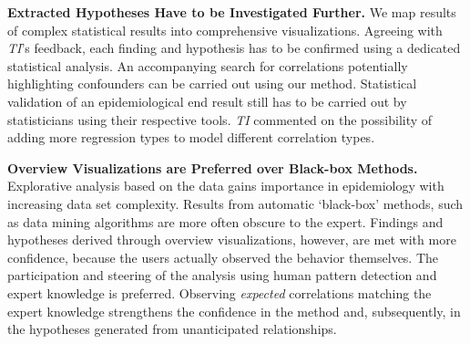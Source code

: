 \documentclass[journal]{style/vgtc} 			          %
\newcommand{\com}[1]{\textcolor{orange}{\uline{#1}}}
\begin{document}
\textbf{Extracted Hypotheses Have to be Investigated Further.}
We map results of complex statistical results into comprehensive visualizations.
Agreeing with \emph{TI}'s feedback, each finding and hypothesis has to be confirmed using a dedicated statistical analysis.
An accompanying search for correlations potentially highlighting confounders can be carried out using our method.
Statistical validation of an epidemiological end result still has to be carried out by statisticians using their respective tools.
\emph{TI} commented on the possibility of adding more regression types to model different correlation types.%

\textbf{Overview Visualizations are Preferred over Black-box Methods.}
Explorative analysis based on the data gains importance in epidemiology with increasing data set complexity.
Results from automatic `black-box' methods, such as data mining algorithms are more often obscure to the expert.
Findings and hypotheses derived through overview visualizations, however, are met with more confidence, because the users actually observed the behavior themselves.
The participation and steering of the analysis using human pattern detection and expert knowledge is preferred.
Observing \emph{expected} correlations matching the expert knowledge strengthens the confidence in the method and, subsequently, in the hypotheses generated from unanticipated relationships.
\end{document}
